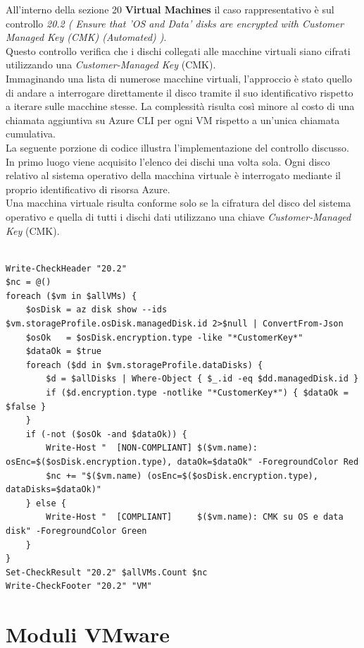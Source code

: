 \documentclass[a4paper,11pt]{report}
\begin{document}
All'interno della sezione 20 \textbf{Virtual Machines} il caso rappresentativo è sul controllo \textit{20.2 ( Ensure that 'OS and Data' disks are encrypted with Customer Managed Key (CMK) (Automated) )}. \\
Questo controllo verifica che i dischi collegati alle macchine virtuali siano cifrati utilizzando una \emph{Customer-Managed Key} (CMK). \\
Immaginando una lista di numerose macchine virtuali, l'approccio è stato quello di andare a interrogare direttamente il disco tramite il suo identificativo rispetto a iterare sulle macchine stesse. La complessità risulta così minore al costo di una chiamata aggiuntiva su Azure CLI per ogni VM rispetto a un'unica chiamata cumulativa.\\
La seguente porzione di codice illustra l'implementazione del controllo discusso. In primo luogo viene acquisito l'elenco dei dischi una volta sola. Ogni disco relativo al sistema operativo della macchina virtuale è interrogato mediante il proprio identificativo di risorsa Azure.\\
Una macchina virtuale risulta conforme solo se la cifratura del disco del sistema operativo e quella di tutti i dischi dati utilizzano una chiave \emph{Customer-Managed Key} (CMK).


\begin{lstlisting}[style=azcli, caption={Implementazione controllo su cifratura con chiave gestita dal cliente su dischi OS e dati}, label={lst:cmk}]

Write-CheckHeader "20.2" 
$nc = @()
foreach ($vm in $allVMs) {
    $osDisk = az disk show --ids $vm.storageProfile.osDisk.managedDisk.id 2>$null | ConvertFrom-Json
    $osOk   = $osDisk.encryption.type -like "*CustomerKey*"
    $dataOk = $true
    foreach ($dd in $vm.storageProfile.dataDisks) {
        $d = $allDisks | Where-Object { $_.id -eq $dd.managedDisk.id }
        if ($d.encryption.type -notlike "*CustomerKey*") { $dataOk = $false }
    }
    if (-not ($osOk -and $dataOk)) {
        Write-Host "  [NON-COMPLIANT] $($vm.name): osEnc=$($osDisk.encryption.type), dataOk=$dataOk" -ForegroundColor Red
        $nc += "$($vm.name) (osEnc=$($osDisk.encryption.type), dataDisks=$dataOk)"
    } else {
        Write-Host "  [COMPLIANT]     $($vm.name): CMK su OS e data disk" -ForegroundColor Green
    }
}
Set-CheckResult "20.2" $allVMs.Count $nc
Write-CheckFooter "20.2" "VM"
\end{lstlisting}

\section{Moduli VMware}
\end{document}
